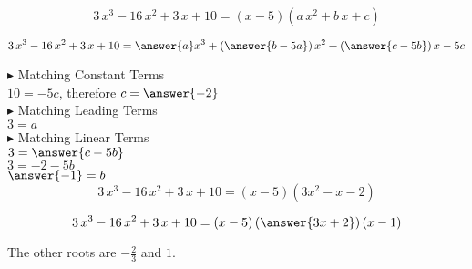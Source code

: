 \documentclass{ximera}
\begin{document}
\begin{example}
\[
3\, x^3 - 16 \, x^2 + 3 \, x + 10  = (x-5) (a \, x^2 + b \, x + c) 
\]



\[
3\, x^3 - 16 \, x^2 + 3 \, x + 10 = \answer{a} x^3 + \left( \answer{b-5a} \right) x^2 + \left( \answer{c-5b} \right) x - 5c
\]



$\blacktriangleright$ Matching Constant Terms \\


$10 = -5c$, therefore $c = \answer{-2}$ \\



$\blacktriangleright$ Matching Leading Terms \\


$3 = a$ \\



$\blacktriangleright$ Matching Linear Terms \\

$3 = \answer{c-5b}$ \\

$3 = -2 - 5b$ \\

$\answer{-1} = b$ \\






\[
3\, x^3 - 16 \, x^2 + 3 \, x + 10  = (x - 5) (3 x^2 -  x - 2) 
\]




\[
3\, x^3 - 16 \, x^2 + 3 \, x + 10  = (x - 5) \left(\answer{3x + 2} \right) (x - 1) 
\]


The other roots are $-\frac{2}{3}$ and $1$.








\end{example}
\end{document}
